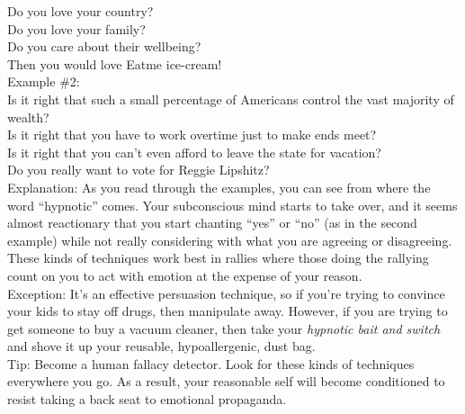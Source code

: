\documentclass[a4paper,12pt,single,pdftex]{scrbook}
\begin{document}
    
      Do you love your country?
    \\

    
      Do you love your family?
    \\

    
      Do you care about their wellbeing?
    \\

    
      Then you would love Eatme ice-cream!
    \\

    
      Example \#2:
    \\

    
      Is it right that such a small percentage of Americans control the vast majority of wealth?
    \\

    
      Is it right that you have to work overtime just to make ends meet?
    \\

    
      Is it right that you can’t even afford to leave the state for vacation?
    \\

    
      Do you really want to vote for Reggie Lipshitz?
    \\

    
      Explanation: As you read through the examples, you can see from where the word “hypnotic” comes.  Your subconscious mind starts to take over, and it seems almost reactionary that you start chanting “yes” or “no” (as in the second example) while not really considering with what you are agreeing or disagreeing.  These kinds of techniques work best in rallies where those doing the rallying count on you to act with emotion at the expense of your reason.
    \\

    
      Exception: It’s an effective persuasion technique, so if you're trying to convince your kids to stay off drugs, then manipulate away.  However, if you are trying to get someone to buy a vacuum cleaner, then take your {\it hypnotic bait and switch} and shove it up your reusable, hypoallergenic, dust bag.
    \\

    
      Tip: Become a human fallacy detector.  Look for these kinds of techniques everywhere you go.  As a result, your reasonable self will become conditioned to resist taking a back seat to emotional propaganda.
    \\
\end{document}
